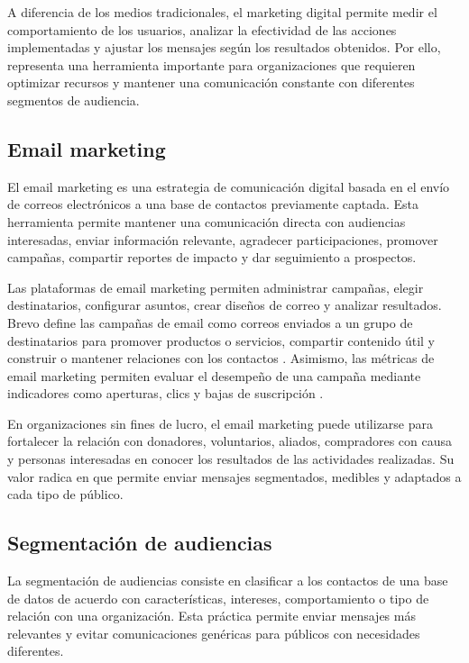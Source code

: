 A diferencia de los medios tradicionales, el marketing digital permite medir el comportamiento de los usuarios, analizar la efectividad de las acciones implementadas y ajustar los mensajes según los resultados obtenidos. Por ello, representa una herramienta importante para organizaciones que requieren optimizar recursos y mantener una comunicación constante con diferentes segmentos de audiencia.

\subsection{Email marketing}

El email marketing es una estrategia de comunicación digital basada en el envío de correos electrónicos a una base de contactos previamente captada. Esta herramienta permite mantener una comunicación directa con audiencias interesadas, enviar información relevante, agradecer participaciones, promover campañas, compartir reportes de impacto y dar seguimiento a prospectos.

Las plataformas de email marketing permiten administrar campañas, elegir destinatarios, configurar asuntos, crear diseños de correo y analizar resultados. Brevo define las campañas de email como correos enviados a un grupo de destinatarios para promover productos o servicios, compartir contenido útil y construir o mantener relaciones con los contactos \cite{brevo_email_campaigns}. Asimismo, las métricas de email marketing permiten evaluar el desempeño de una campaña mediante indicadores como aperturas, clics y bajas de suscripción \cite{mailchimp_benchmarks}.

En organizaciones sin fines de lucro, el email marketing puede utilizarse para fortalecer la relación con donadores, voluntarios, aliados, compradores con causa y personas interesadas en conocer los resultados de las actividades realizadas. Su valor radica en que permite enviar mensajes segmentados, medibles y adaptados a cada tipo de público.

\subsection{Segmentación de audiencias}

La segmentación de audiencias consiste en clasificar a los contactos de una base de datos de acuerdo con características, intereses, comportamiento o tipo de relación con una organización. Esta práctica permite enviar mensajes más relevantes y evitar comunicaciones genéricas para públicos con necesidades diferentes.

